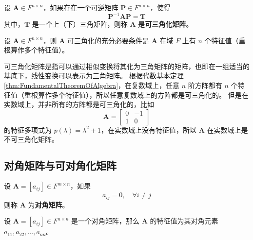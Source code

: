 \begin{definition}
    设 $\mathbf{A} \in F^{n \times n}$，如果存在一个可逆矩阵 $\mathbf{P} \in F^{n \times n}$，使得
    \[
        \mathbf{P}^{-1}\mathbf{A}\mathbf{P} = \mathbf{T}
    \]
    其中，$\mathbf{T}$ 是一个上（下）三角矩阵，则称 $\mathbf{A}$ 是\textbf{可三角化矩阵}。
    \label{def:triangularizable_matrix}
\end{definition}

\begin{proposition}[可三角化矩阵的充要条件]
    设 $\mathbf{A} \in F^{n \times n}$，则 $\mathbf{A}$ 可三角化的充分必要条件是 $\mathbf{A}$ 在域 $F$ 上有 $n$ 个特征值（重根算作多个特征值）。
    \label{prop:triangularizable_matrix_necessary_sufficient_condition}
\end{proposition}

\begin{note}
    可三角化矩阵是指可以通过相似变换将其化为三角矩阵的矩阵，也即在一组适当的基底下，线性变换可以表示为三角矩阵。
    根据代数基本定理\ref{thm:FundamentalTheoremOfAlgebra}，在复数域上，任意 $n$ 阶方阵都有 $n$ 个特征值（重根算作多个特征值），所以任意复数域上的方阵都是可三角化的。
    但是在实数域上，并非所有的方阵都是可三角化的，比如
    \[
        \mathbf{A} = \begin{bmatrix}
            0 & -1 \\
            1 & 0
        \end{bmatrix}
    \]
    的特征多项式为 $p(\lambda) = \lambda^2 + 1$，在实数域上没有特征值，所以 $\mathbf{A}$ 在实数域上是不可三角化矩阵。
\end{note}

\vspace{1em}
\subsection{对角矩阵与可对角化矩阵}

\begin{definition}
    设 $\mathbf{A} = [a_{ij}] \in F^{m \times n}$，如果
    \[
        a_{ij} = 0, \quad \forall i \neq j
    \]
    则称 $\mathbf{A}$ 为\textbf{对角矩阵}。
    \label{def:diagonal_matrix}
\end{definition}

\begin{proposition}[对角矩阵的主对角元素即为它的特征值]
    设 $\mathbf{A} = [a_{ij}] \in F^{n \times n}$ 是一个对角矩阵，那么 $\mathbf{A}$ 的特征值为其对角元素 $a_{11}, a_{22}, \ldots, a_{nn}$。
    \label{prop:diagonal_matrix_eigenvalue}
\end{proposition}

